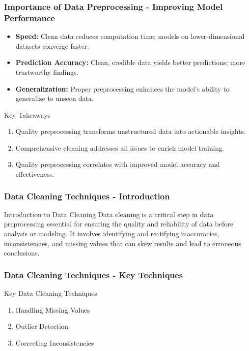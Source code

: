 \documentclass[aspectratio=169]{beamer}
\begin{document}
\begin{frame}[fragile]
    \frametitle{Importance of Data Preprocessing - Improving Model Performance}
    \begin{itemize}
        \item \textbf{Speed:} Clean data reduces computation time; models on lower-dimensional datasets converge faster.
        \item \textbf{Prediction Accuracy:} Clean, credible data yields better predictions; more trustworthy findings.
        \item \textbf{Generalization:} Proper preprocessing enhances the model's ability to generalize to unseen data.
    \end{itemize}
    
    \begin{block}{Key Takeaways}
        \begin{enumerate}
            \item Quality preprocessing transforms unstructured data into actionable insights.
            \item Comprehensive cleaning addresses all issues to enrich model training.
            \item Quality preprocessing correlates with improved model accuracy and effectiveness.
        \end{enumerate}
    \end{block}
\end{frame}

\begin{frame}[fragile]
    \frametitle{Data Cleaning Techniques - Introduction}
    \begin{block}{Introduction to Data Cleaning}
        Data cleaning is a critical step in data preprocessing essential for ensuring the quality and reliability of data before analysis or modeling. 
        It involves identifying and rectifying inaccuracies, inconsistencies, and missing values that can skew results and lead to erroneous conclusions.
    \end{block}
\end{frame}

\begin{frame}[fragile]
    \frametitle{Data Cleaning Techniques - Key Techniques}
    \begin{block}{Key Data Cleaning Techniques}
        \begin{enumerate}
            \item Handling Missing Values
            \item Outlier Detection
            \item Correcting Inconsistencies
        \end{enumerate}
    \end{block}
\end{frame}
\end{document}
